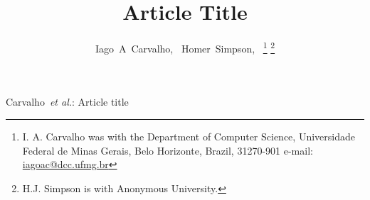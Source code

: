 \documentclass[journal]{IEEEtran}
\begin{document}
\title{\title{Article Title}}
%
%
%

\author{Iago~A~Carvalho,~
        Homer~Simpson,~%
\thanks{I. A. Carvalho was with the Department of Computer Science, Universidade Federal de Minas Gerais, Belo Horizonte,
Brazil, 31270-901 e-mail: \href{mailto:iagoac@dcc.ufmg.br}{iagoac@dcc.ufmg.br}}%
\thanks{H.J. Simpson is with Anonymous University.}}%

% 
%



%
{Carvalho~\MakeLowercase{\textit{et al.}}: Article title}
% 
\end{document}
